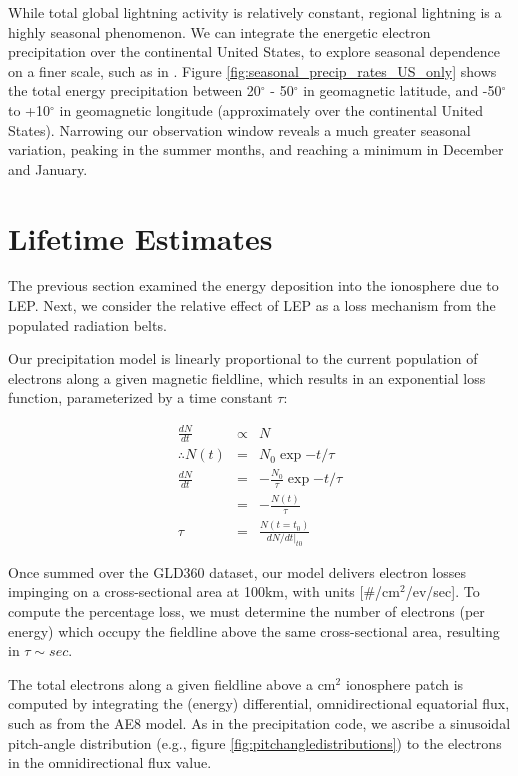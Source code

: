 While total global lightning activity is relatively constant, regional lightning is a highly seasonal phenomenon. We can integrate the energetic electron precipitation over the continental United States, to explore seasonal dependence on a finer scale, such as in \cite{Gemelos2009}. Figure \ref{fig:seasonal_precip_rates_US_only} shows the total energy precipitation between 20$^\circ$ - 50$^\circ$ in geomagnetic latitude, and -50$^\circ$ to +10$^\circ$ in geomagnetic longitude (approximately over the continental United States). Narrowing our observation window reveals a much greater seasonal variation, peaking in the summer months, and reaching a minimum in December and January.



\section{Lifetime Estimates}
The previous section examined the energy deposition into the ionosphere due to LEP. Next, we consider the relative effect of LEP as a loss mechanism from the populated radiation belts.

Our precipitation model is linearly proportional to the current population of electrons along a given magnetic fieldline, which results in an exponential loss function, parameterized by a time constant $\tau$:

\begin{eqnarray}
\frac{dN}{dt} & \propto & N \\
\therefore N(t) & = & N_0 \exp{-t/\tau} \\
\frac{dN}{dt} & = & -\frac{N_0}{\tau}\exp{-t/\tau} \\
& = & -\frac{N(t)}{\tau} \\
\tau & = & \frac{N(t=t_0)}{dN/dt\rvert_{t0}}
\label{eqn:tau}
\end{eqnarray}

Once summed over the GLD360 dataset, our model delivers electron losses impinging on a cross-sectional area at 100km, with units [$\#$/cm$^2$/ev/sec]. To compute the percentage loss, we must determine the number of electrons (per energy) which occupy the fieldline above the same cross-sectional area, resulting in $\tau \sim sec$.

The total electrons along a given fieldline above a cm$^2$ ionosphere patch is computed by integrating the (energy) differential, omnidirectional equatorial flux, such as from the AE8 model. As in the precipitation code, we ascribe a sinusoidal pitch-angle distribution (e.g., figure \ref{fig:pitchangledistributions}) to the electrons in the omnidirectional flux value. 

